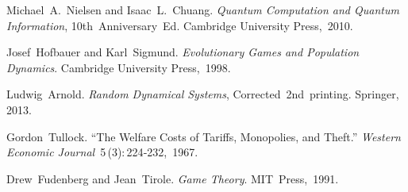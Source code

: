 \documentclass[12pt]{article}
\theoremstyle{plain}
\begin{document}
\begin{thebibliography}{9}\itemsep2pt
Michael A. Nielsen and Isaac L. Chuang.
\newblock \emph{Quantum Computation and Quantum Information}, 10th Anniversary Ed.
Cambridge University Press, 2010.

Josef Hofbauer and Karl Sigmund.
\newblock \emph{Evolutionary Games and Population Dynamics}.  Cambridge
University Press, 1998.  

Ludwig Arnold.
\newblock \emph{Random Dynamical Systems}, Corrected 2nd printing.  Springer,
2013.  

Gordon Tullock.
\newblock “The Welfare Costs of Tariffs, Monopolies, and Theft.”
\emph{Western Economic Journal} 5 (3): 224‑232, 1967.

Drew Fudenberg and Jean Tirole.
\newblock \emph{Game Theory}.  MIT Press, 1991.
\end{thebibliography}
\end{document}
